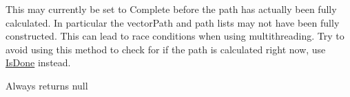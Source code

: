 
\begin{DoxyRefList}
\item[Member \mbox{\hyperlink{class_pathfinding_1_1_path_a55b9edfbb223bc171390817a072d6f25}{Pathfinding.Path.Complete\+State}} ]\label{bug__bug000001}%
%
This may currently be set to Complete before the path has actually been fully calculated. In particular the vector\+Path and path lists may not have been fully constructed. This can lead to race conditions when using multithreading. Try to avoid using this method to check for if the path is calculated right now, use \mbox{\hyperlink{class_pathfinding_1_1_path_aedc88f47f6da4068be44b37bd3e93769}{Is\+Done}} instead.  
\item[Member \mbox{\hyperlink{interface_pathfinding_1_1_r_v_o_1_1_i_agent_ac4e55b74eb488c8f7a8e295cd2141efa}{Pathfinding.R\+VO.I\+Agent.Neighbour\+Obstacles}} ]\label{bug__bug000002}%
%
Always returns null 
\end{DoxyRefList}